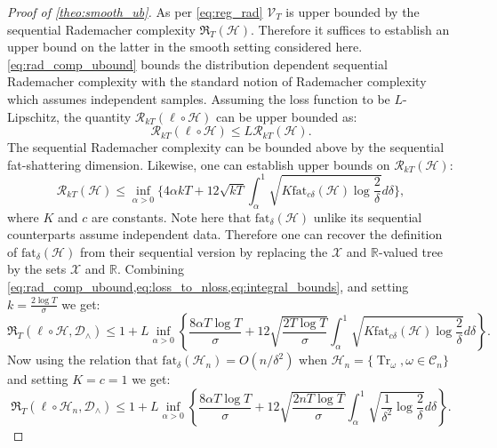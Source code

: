 \begin{proof}[Proof of \cref{theo:smooth_ub}]
    

As per \cref{eq:reg_rad} $\mathcal{V}_T$ is upper bounded by the sequential Rademacher complexity $\mathfrak{R}_T (\mathcal{H})$. Therefore it suffices to establish an upper bound on the latter in the smooth setting considered here. \cref{eq:rad_comp_ubound} bounds the distribution dependent sequential Rademacher complexity with the standard notion of Rademacher complexity which assumes independent samples. Assuming the loss function to be $L$-Lipschitz, the quantity $\mathcal{R}_{kT}(\ell \circ \mathcal{H})$ can be upper bounded as:
\begin{equation}
\label{eq:loss_to_nloss}
    \mathcal{R}_{kT}(\ell \circ \mathcal{H}) \leq L \mathcal{R}_{kT}(\mathcal{H}).
\end{equation}
The sequential Rademacher complexity can be bounded above by the sequential fat-shattering dimension. Likewise, one can establish upper bounds on $\mathcal{R}_{kT} (\mathcal{H})$:
\begin{equation}
\label{eq:integral_bounds}
    \mathcal{R}_{kT}(\mathcal{H}) \leq  \inf_{\alpha > 0} \Big\{ 4 \alpha k T + 12 \sqrt{kT} \int_\alpha^1 \sqrt{K \text{fat}_{c \delta} (\mathcal{H}) \log \frac{2}{\delta}} d\delta \Big\},
\end{equation}
where $K$ and $c$ are constants. Note here that $\text{fat}_{\delta} (\mathcal{H})$ unlike its sequential counterparts assume independent data. Therefore one can recover the definition of $\text{fat}_{\delta} (\mathcal{H})$ from their sequential version by replacing the $\mathcal{X}$ and $\mathbb{R}$-valued tree by the sets $\mathcal{X}$ and $\mathbb{R}$. Combining \cref{eq:rad_comp_ubound,eq:loss_to_nloss,eq:integral_bounds}, and setting $k = \frac{2 \log T}{\sigma}$ we get:
\begin{equation}
    \mathfrak{R}_T(\ell \circ \mathcal{H}, \mathcal{D}_\wedge) \leq 1 + L \inf_{\alpha > 0} \left\{ \frac{8 \alpha T \log T}{\sigma} + 12 \sqrt{\frac{2 T \log T}{\sigma}} \int_\alpha^1 \sqrt{K \text{fat}_{c \delta} (\mathcal{H}) \log \frac{2}{\delta}} d\delta \right\}.
\end{equation}
Now using the relation that $\text{fat}_\delta (\mathcal{H}_n) = O(n/\delta^2)$ when $\mathcal{H}_n=\{\operatorname{Tr}_\omega, \omega\in\mathcal C_n\}$ and setting $K = c = 1$ we get:
\begin{equation}
\label{eq:penultimate_ubound}
    \mathfrak{R}_T(\ell \circ \mathcal{H}_n, \mathcal{D}_\wedge) \leq 1 + L \inf_{\alpha > 0} \left\{ \frac{8 \alpha T \log T}{\sigma} + 12 \sqrt{\frac{2 n T \log T}{\sigma}} \int_\alpha^1 \sqrt{\frac{1}{\delta^2} \log \frac{2}{\delta}} d\delta \right\}.

\end{equation}
\end{proof}
